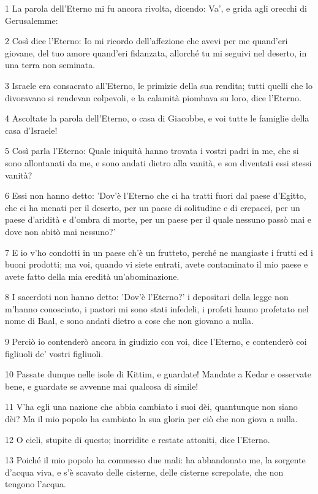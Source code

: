 \par 1 La parola dell'Eterno mi fu ancora rivolta, dicendo: Va', e grida agli orecchi di Gerusalemme:
\par 2 Così dice l'Eterno: Io mi ricordo dell'affezione che avevi per me quand'eri giovane, del tuo amore quand'eri fidanzata, allorché tu mi seguivi nel deserto, in una terra non seminata.
\par 3 Israele era consacrato all'Eterno, le primizie della sua rendita; tutti quelli che lo divoravano si rendevan colpevoli, e la calamità piombava su loro, dice l'Eterno.
\par 4 Ascoltate la parola dell'Eterno, o casa di Giacobbe, e voi tutte le famiglie della casa d'Israele!
\par 5 Così parla l'Eterno: Quale iniquità hanno trovata i vostri padri in me, che si sono allontanati da me, e sono andati dietro alla vanità, e son diventati essi stessi vanità?
\par 6 Essi non hanno detto: 'Dov'è l'Eterno che ci ha tratti fuori dal paese d'Egitto, che ci ha menati per il deserto, per un paese di solitudine e di crepacci, per un paese d'aridità e d'ombra di morte, per un paese per il quale nessuno passò mai e dove non abitò mai nessuno?'
\par 7 E io v'ho condotti in un paese ch'è un frutteto, perché ne mangiaste i frutti ed i buoni prodotti; ma voi, quando vi siete entrati, avete contaminato il mio paese e avete fatto della mia eredità un'abominazione.
\par 8 I sacerdoti non hanno detto: 'Dov'è l'Eterno?' i depositari della legge non m'hanno conosciuto, i pastori mi sono stati infedeli, i profeti hanno profetato nel nome di Baal, e sono andati dietro a cose che non giovano a nulla.
\par 9 Perciò io contenderò ancora in giudizio con voi, dice l'Eterno, e contenderò coi figliuoli de' vostri figliuoli.
\par 10 Passate dunque nelle isole di Kittim, e guardate! Mandate a Kedar e osservate bene, e guardate se avvenne mai qualcosa di simile!
\par 11 V'ha egli una nazione che abbia cambiato i suoi dèi, quantunque non siano dèi? Ma il mio popolo ha cambiato la sua gloria per ciò che non giova a nulla.
\par 12 O cieli, stupite di questo; inorridite e restate attoniti, dice l'Eterno.
\par 13 Poiché il mio popolo ha commesso due mali: ha abbandonato me, la sorgente d'acqua viva, e s'è scavato delle cisterne, delle cisterne screpolate, che non tengono l'acqua.

